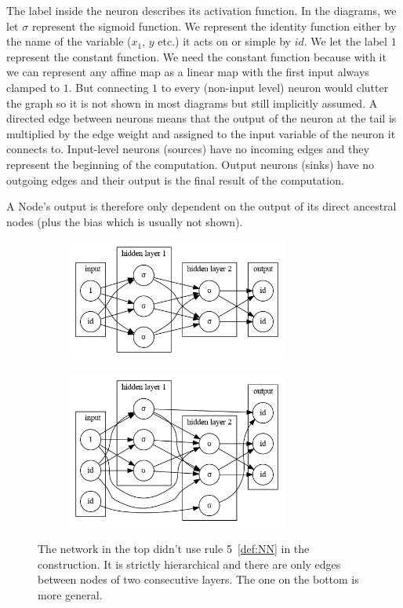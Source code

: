 \documentclass[11pt, a4paper]{report}
\theoremstyle{plain}
\theoremstyle{definition}
\theoremstyle{remark}
\begin{document}
The label inside the neuron describes its activation function.
In the diagrams, we let $\sigma$ represent the sigmoid function.
We represent the identity function either by the name of the variable ($x_1$,
$y$ etc.) it acts on or simple by 
$id$.   We let the label $1$ represent the constant function. We need the
constant function because with it we can represent any affine map as a linear
map with the first input always clamped to $1$. But connecting $1$ to every
(non-input level) neuron would clutter the graph so it is not shown in most
diagrams but still implicitly assumed.
A directed edge between neurons means that the output of the neuron at the tail
is multiplied by the edge weight and assigned to the input variable of the
neuron it connects to.
Input-level neurons (sources) have no incoming edges and they represent the
beginning of the
computation.
Output neurons (sinks) have no outgoing edges and their output is the final result of
the computation.

A Node's output is therefore only dependent on the output of its direct
ancestral nodes 
(plus the bias which is usually not shown).

\begin{figure}[!h]
\begin{framed}
\centering
\begin{subfigure}[b]{0.5\textwidth}
\includegraphics[width=0.8\textwidth]{./plots/neuronlayers.gv.png}
\end{subfigure}
\begin{subfigure}[b]{0.5\textwidth}
\includegraphics[width=0.8\textwidth]{./plots/neuronlayers.2.gv.png}
\end{subfigure}
\caption{The network in the top didn't use rule 5~\ref{def:NN} in the construction.
It is strictly hierarchical and there are only edges between nodes of two
consecutive layers. The one on the bottom is more general.
}
\label{fig:nn1}
\end{framed}
\end{figure}
\end{document}
